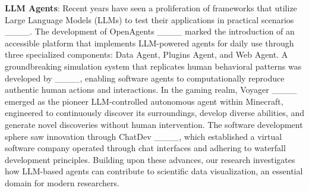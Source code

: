 \noindent\textbf{LLM Agents}: Recent years have seen a proliferation of frameworks that utilize Large Language Models (LLMs) to test their applications in practical scenarios ____. The development of OpenAgents ____ marked the introduction of an accessible platform that implements LLM-powered agents for daily use through three specialized components: Data Agent, Plugins Agent, and Web Agent. A groundbreaking simulation system that replicates human behavioral patterns was developed by ____, enabling software agents to computationally reproduce authentic human actions and interactions. In the gaming realm, Voyager ____ emerged as the pioneer LLM-controlled autonomous agent within Minecraft, engineered to continuously discover its surroundings, develop diverse abilities, and generate novel discoveries without human intervention. The software development sphere saw innovation through ChatDev ____, which established a virtual software company operated through chat interfaces and adhering to waterfall development principles. Building upon these advances, our research investigates how LLM-based agents can contribute to scientific data visualization, an essential domain for modern researchers.